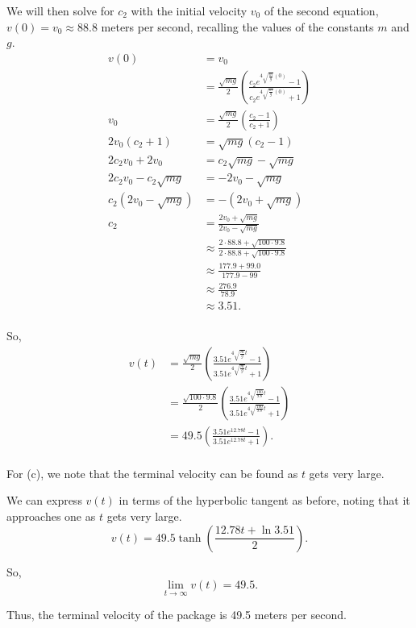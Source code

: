 \documentclass[../hw11]{subfiles}
\begin{document}
We will then solve for $c_2$ with the initial velocity $v_0$ of the second equation, $v(0)=v_0\approx88.8$ meters per second, recalling the values of the constants $m$ and $g$.
\begin{align*}
    v(0)&=v_0\\
    &=\frac{\sqrt{mg}}{2}\left( \frac{c_2e^{4\sqrt{\frac{m}{g}}(0)}-1}{c_2e^{4\sqrt{\frac{m}{g}}(0)}+1} \right)\\
    v_0&=\frac{\sqrt{mg}}{2}\left( \frac{c_2-1}{c_2+1} \right)\\
    2v_0(c_2+1)&=\sqrt{mg}(c_2-1) \\
    2 c_2 v_0 + 2 v_0 &= c_2\sqrt{mg} - \sqrt{mg} \\
    2 c_2 v_0 - c_2\sqrt{mg} &= - 2 v_0 - \sqrt{mg} \\
    c_2(2v_0-\sqrt{mg})&=-(2v_0+\sqrt{mg}) \\
    c_2&=\frac{2v_0+\sqrt{mg}}{2v_0-\sqrt{mg}} \\
    &\approx\frac{2\cdot88.8+\sqrt{100\cdot9.8}}{2\cdot88.8+\sqrt{100\cdot9.8}} \\
    &\approx\frac{177.9+99.0}{177.9-99} \\
    &\approx\frac{276.9}{78.9} \\
    &\approx3.51. \\
\end{align*}

So,
\begin{align*}
    v(t)&=\frac{\sqrt{mg}}{2}\left( \frac{3.51e^{4\sqrt{\frac{m}{g}}t}-1}{3.51e^{4\sqrt{\frac{m}{g}}t}+1} \right)\\
    &= \frac{\sqrt{100\cdot9.8}}{2}\left( \frac{3.51e^{4\sqrt{\frac{100}{9.8}}t}-1}{3.51e^{4\sqrt{\frac{100}{9.8}}t}+1} \right)\\
    &= 49.5\left( \frac{3.51e^{12.78t}-1}{3.51e^{12.78t}+1} \right). \\
\end{align*}

For (c), we note that the terminal velocity can be found as $t$ gets very large. 

We can express $v(t)$ in terms of the hyperbolic tangent as before, noting that it approaches one as $t$ gets very large. 
\[v(t)=49.5\tanh{\left( \frac{12.78t+\ln{3.51}}{2} \right)}.\]

So, \[\lim\limits_{t\to\infty} v(t) = 49.5.\]

Thus, the terminal velocity of the package is 49.5 meters per second.
\end{document}
